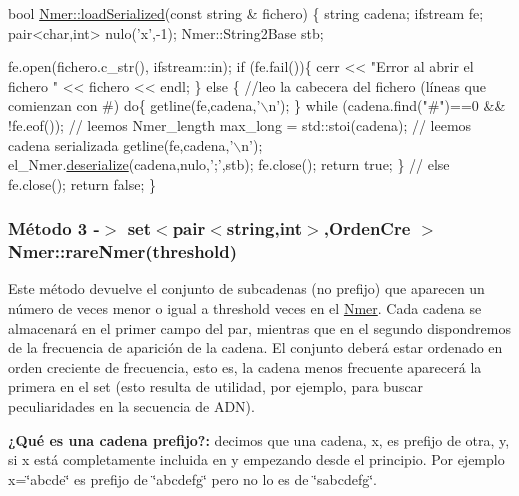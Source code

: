\begin{DoxyCode}
\textcolor{keywordtype}{bool} \hyperlink{classNmer_a418c016bb6e04d2f699ddb694ee0221f}{Nmer::loadSerialized}(\textcolor{keyword}{const} \textcolor{keywordtype}{string} & fichero) \{
 \textcolor{keywordtype}{string} cadena;
 ifstream fe;
 pair<char,int> nulo(\textcolor{charliteral}{'x'},-1);
 Nmer::String2Base stb;
 
 fe.open(fichero.c\_str(), ifstream::in);
   \textcolor{keywordflow}{if} (fe.fail())\{
     cerr << \textcolor{stringliteral}{"Error al abrir el fichero "} << fichero << endl;
   \} 
   \textcolor{keywordflow}{else} \{
    \textcolor{comment}{//leo la cabecera del fichero (líneas que comienzan con #)}
    \textcolor{keywordflow}{do}\{ 
      getline(fe,cadena,\textcolor{charliteral}{'\(\backslash\)n'}); 
    \} \textcolor{keywordflow}{while} (cadena.find(\textcolor{stringliteral}{"#"})==0 && !fe.eof());
    \textcolor{comment}{// leemos Nmer\_length}
     max\_long = std::stoi(cadena);
     \textcolor{comment}{// leemos cadena serializada}
    getline(fe,cadena,\textcolor{charliteral}{'\(\backslash\)n'});
    el\_Nmer.\hyperlink{classktree_a66d27ffb43b3c790370b45c0a8309534}{deserialize}(cadena,nulo,\textcolor{charliteral}{';'},stb); 
    fe.close();
    \textcolor{keywordflow}{return} \textcolor{keyword}{true};
  \} \textcolor{comment}{// else}
  fe.close();
  \textcolor{keywordflow}{return} \textcolor{keyword}{false};
 \}
\end{DoxyCode}
\hypertarget{index_rare}{}\subsubsection{Método 3 -\/$>$ set$<$pair$<$string,int$>$,\+Orden\+Cre $>$ Nmer\+::rare\+Nmer(threshold)}\label{index_rare}
Este método devuelve el conjunto de subcadenas (no prefijo) que aparecen un número de veces menor o igual a threshold veces en el \hyperlink{classNmer}{Nmer}. Cada cadena se almacenará en el primer campo del par, mientras que en el segundo dispondremos de la frecuencia de aparición de la cadena. El conjunto deberá estar ordenado en orden creciente de frecuencia, esto es, la cadena menos frecuente aparecerá la primera en el set (esto resulta de utilidad, por ejemplo, para buscar peculiaridades en la secuencia de A\+DN).

{\bfseries ¿\+Qué es una cadena prefijo?\+:} decimos que una cadena, x, es prefijo de otra, y, si x está completamente incluida en y empezando desde el principio. Por ejemplo x=\char`\"{}abcde\char`\"{} es prefijo de \char`\"{}abcdefg\char`\"{} pero no lo es de \char`\"{}sabcdefg\char`\"{}.

